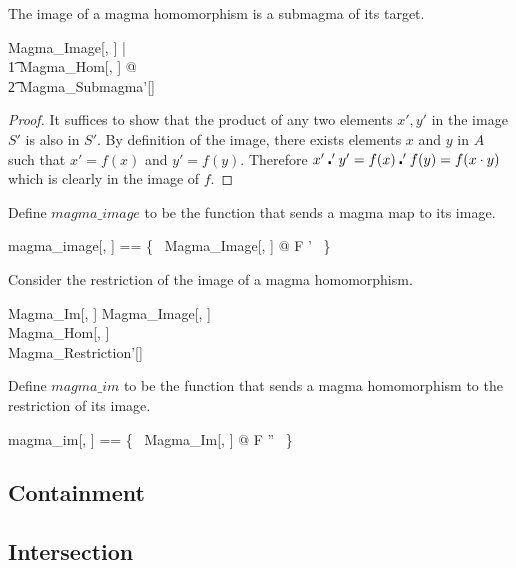 \documentclass{amsart}
\begin{document}
\begin{remark}
The image of a magma homomorphism is a submagma of its target.

\begin{zed}
	\forall Magma\_Image[\setT, \setU] | \\
	\t1	Magma\_Hom[\setT, \setU] @ \\
	\t2		Magma\_Submagma'[\setU]
\end{zed}

\begin{proof}
It suffices to show that the product of any two elements $x', y'$ in the image $S'$ is 
also in $S'$. By definition of the image, there exists elements $x$ and $y$ in $A$
such that $x' = f(x)$ and $y' = f(y)$.
Therefore $x' \mathbin{\centerdot}' y' = f(x) \mathbin{\centerdot}' f(y) = f(x \mathbin{\cdot} y)$ which is clearly in the image of $f$. 
\end{proof}

\end{remark}

Define $magma\_image$ to be the function that sends a magma map to its image.

\begin{zed}
	magma\_image[\genT, \genU] == \{~ Magma\_Image[\genT, \genU] @ F \mapsto \strucS' ~\}
\end{zed}

Consider the restriction of the image of a magma homomorphism.

\begin{schema}{Magma\_Im}[\genT, \genU]
	Magma\_Image[\genT, \genU] \\
	Magma\_Hom[\genT, \genU] \\
	Magma\_Restriction'[\genU]
\end{schema}

Define $magma\_im$ to be the function that sends a magma homomorphism to the
restriction of its image.

\begin{zed}
	magma\_im[\genT, \genU] == \{~ Magma\_Im[\genT, \genU] @ F \mapsto \strucA'' ~\}
\end{zed}

\subsection{Containment}

\subsection{Intersection}
\end{document}
